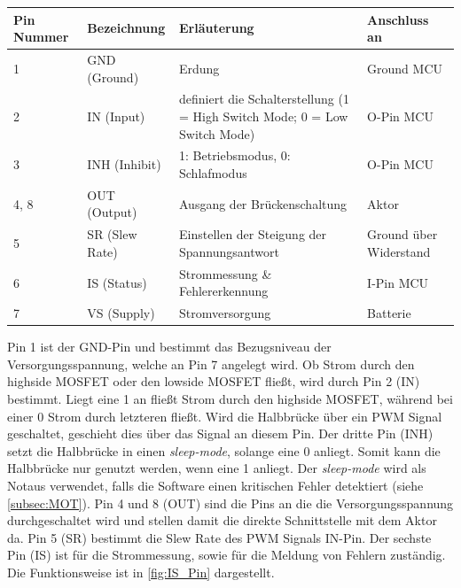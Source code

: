 \begin{table}[H]
	\centering
		\begin{tabular}{l p{} p{8cm} p{3cm}}
			\textbf{Pin Nummer} & \textbf{Bezeichnung} & \textbf{Erläuterung} & \textbf{Anschluss an} \\ \hline
			1 & GND (Ground) & Erdung & Ground MCU \\
			2 & IN (Input) & definiert die Schalterstellung (1 = High Switch Mode; 0 = Low Switch Mode) & O-Pin MCU \\
			3 & INH (Inhibit) & 1: Betriebsmodus, 0: Schlafmodus & O-Pin MCU \\
			4, 8 & OUT (Output) & Ausgang der Brückenschaltung & Aktor \\
			5 & SR (Slew Rate) & Einstellen der Steigung der Spannungsantwort & Ground über Widerstand \\
			6 & IS (Status) & Strommessung \& Fehlererkennung & I-Pin MCU\\
			7 & VS (Supply) & Stromversorgung & Batterie\\
		\end{tabular}
	
	\label{tab:Pinverteilung}
\end{table}\noindent
Pin 1 ist der GND-Pin und bestimmt das Bezugsniveau der Versorgungsspannung, welche an Pin 7 angelegt wird. Ob Strom durch den highside MOSFET oder den lowside MOSFET fließt, wird durch Pin 2 (IN) bestimmt. Liegt eine 1 an fließt Strom durch den highside MOSFET, während bei einer 0 Strom durch letzteren fließt. Wird die Halbbrücke über ein PWM Signal geschaltet, geschieht dies über das Signal an diesem Pin. Der dritte Pin (INH) setzt die Halbbrücke in einen \textit{sleep-mode}, solange eine 0 anliegt. Somit kann die Halbbrücke nur genutzt werden, wenn eine 1 anliegt. Der \textit{sleep-mode} wird als Notaus verwendet, falls die Software einen kritischen Fehler detektiert (siehe \autoref{subsec:MOT}). Pin 4 und 8 (OUT) sind die Pins an die die Versorgungsspannung durchgeschaltet wird und stellen damit die direkte Schnittstelle mit dem Aktor da. Pin 5 (SR) bestimmt die Slew Rate des PWM Signals IN-Pin. Der sechste Pin (IS) ist für die Strommessung, sowie für die Meldung von Fehlern zuständig. Die Funktionsweise ist in \autoref{fig:IS_Pin} dargestellt.\\

